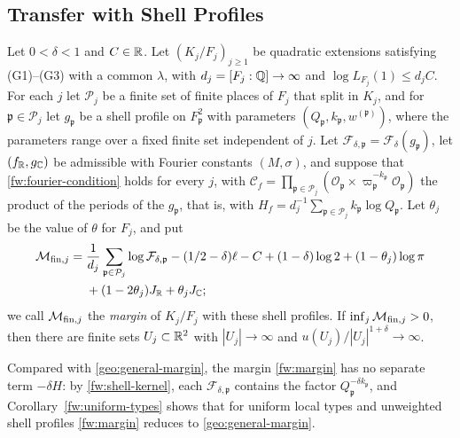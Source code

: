 \subsection{Transfer with Shell Profiles}

\begin{proposition}\label{fw:transfer}
Let $0<\delta<1$ and $C\in\mathbb R$. Let $(K_j/F_j)_{j\ge1}$ be quadratic
extensions satisfying (G1)--(G3) with a common $\lambda$, with
$d_j=[F_j:\mathbb Q]\to\infty$ and $\log L_{F_j}(1)\le d_jC$. For each $j$ let
$\mathcal P_j$ be a finite set of finite places of $F_j$ that split in
$K_j$, and for $\mathfrak p\in\mathcal P_j$ let $g_{\mathfrak p}$ be a
shell profile on $F_{\mathfrak p}^2$ with parameters $(Q_{\mathfrak
p},k_{\mathfrak p},w^{(\mathfrak p)})$, where the parameters range over
a fixed finite set independent of $j$. Let $\mathcal F_{\delta,\mathfrak
p}=\mathcal F_\delta(g_{\mathfrak p})$, let $(f_\mathbb R,g_\mathbb C)$ be admissible
with Fourier constants $(M,\sigma)$, and suppose that
\eqref{fw:fourier-condition} holds for every $j$, with $\mathcal
C_f=\prod_{\mathfrak p\in\mathcal P_j}(\mathcal O_{\mathfrak
p}\times\varpi_{\mathfrak p}^{-k_{\mathfrak p}}\mathcal O_{\mathfrak p})$
the product of the periods of the $g_{\mathfrak p}$, that is, with
$H_f=d_j^{-1}\sum_{\mathfrak p\in\mathcal P_j}k_{\mathfrak p}\log
Q_{\mathfrak p}$. Let $\theta_j$ be the value of $\theta$ for $F_j$, and
put
\begin{equation}\label{fw:margin}
 \begin{split}
 \mathcal M_{{\rm fin},j}={}&
 \frac1{d_j}\sum_{\mathfrak p\in\mathcal P_j}\log\mathcal F_{\delta,\mathfrak p}
 -(1/2-\delta)\ell-C+(1-\delta)\log2+(1-\theta_j)\log\pi\\
 &+(1-2\theta_j)J_\mathbb R+\theta_jJ_\mathbb C ;
 \end{split}
\end{equation}
we call $\mathcal M_{{\rm fin},j}$ the \emph{margin} of $K_j/F_j$ with
these shell profiles. If $\inf_j\mathcal M_{{\rm fin},j}>0$, then there
are finite sets $U_j\subset\mathbb R^2$ with $|U_j|\to\infty$ and
$u(U_j)/|U_j|^{1+\delta}\to\infty$.
\end{proposition}

Compared with \eqref{geo:general-margin}, the margin \eqref{fw:margin}
has no separate term $-\delta H$: by \eqref{fw:shell-kernel}, each
$\mathcal F_{\delta,\mathfrak p}$ contains the factor $Q_{\mathfrak
p}^{-\delta k_{\mathfrak p}}$, and Corollary~\ref{fw:uniform-types}
shows that for uniform local types and unweighted shell profiles
\eqref{fw:margin} reduces to \eqref{geo:general-margin}.

